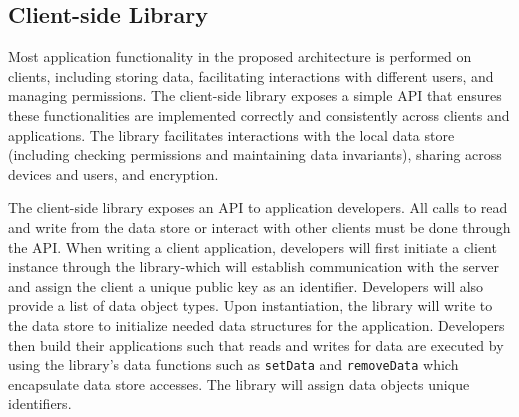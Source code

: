 

\subsection{Client-side Library}



Most application functionality in the proposed architecture is performed on clients, including storing data, facilitating interactions with different users, and managing permissions. The \name{} client-side library exposes a simple API that ensures these functionalities are implemented correctly and consistently across clients and applications. The library facilitates interactions with the local data store (including checking permissions and maintaining data invariants), sharing across devices and users, and encryption.  

The \name{} client-side library exposes an API to application developers. All calls to read and write from the data store or interact with other clients must be done through the \name{} API. When writing a client application, developers will first initiate a \name{} client instance through the library-which will establish communication with the server and assign the client a unique public key as an identifier. Developers will also provide a list of data object types. 
Upon instantiation, the library will write to the data store to initialize needed data structures for the application. Developers then build their applications such that reads and writes for data are executed by using the library's data functions such as \texttt{setData} and \texttt{removeData} which encapsulate data store accesses. The \name{} library will assign data objects unique identifiers. 

